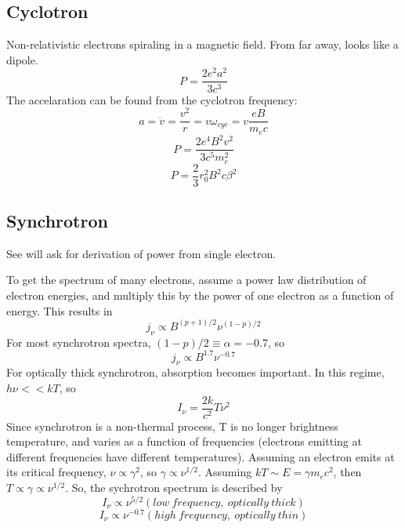 \subsection{Cyclotron}
Non-relativistic electrons spiraling in a magnetic field.  From far away, looks like a dipole.  
\begin{displaymath}P=\frac{2e^2a^2}{3c^3}\end{displaymath}
The accelaration can be found from the cyclotron frequency:
\begin{displaymath}a=\dot{v}=\frac{v^2}{r}=v\omega_{cyc}=v\frac{eB}{m_ec}\end{displaymath}
\begin{displaymath}P=\frac{2e^4B^2v^2}{3c^5m_e^2}\end{displaymath}
\begin{displaymath}\boxed{P=\frac{2}{3}r_0^2B^2c\beta^2}\end{displaymath}

\subsection{Synchrotron}
See will ask for derivation of power from single electron.  

To get the spectrum of many electrons, assume a power law distribution of electron energies, and 
multiply this by the power of one electron as a function of energy.  This results in 
\begin{displaymath}j_{\nu}\propto B^{(p+1)/2}\nu^{(1-p)/2}\end{displaymath}
For most synchrotron spectra, $(1-p)/2\equiv \alpha=-0.7$, so
\begin{displaymath}j_{\nu}\propto B^{1.7}\nu^{-0.7}\end{displaymath}
For optically thick synchrotron, absorption becomes important.  In this regime, $h\nu<<kT$, so
\begin{displaymath}I_{\nu}=\frac{2k}{c^2}T\nu^2\end{displaymath}
Since synchrotron is a non-thermal process, T is no longer brightness temperature, and varies 
as a function of frequencies (electrons emitting at different frequencies have different 
temperatures).  Assuming an electron emits at its critical frequency, $\nu\propto\gamma^2$, so 
$\gamma\propto\nu^{1/2}$.  Assuming $kT\sim E=\gamma m_ec^2$, then 
$T\propto\gamma\propto\nu^{1/2}$.  So, the sychrotron spectrum is described by
\begin{displaymath}I_{\nu}\propto \nu^{5/2} (low\ frequency,\ optically\ thick)\end{displaymath}
\begin{displaymath}I_{\nu}\propto \nu^{-0.7} (high\ frequency,\ optically\ thin)\end{displaymath}



